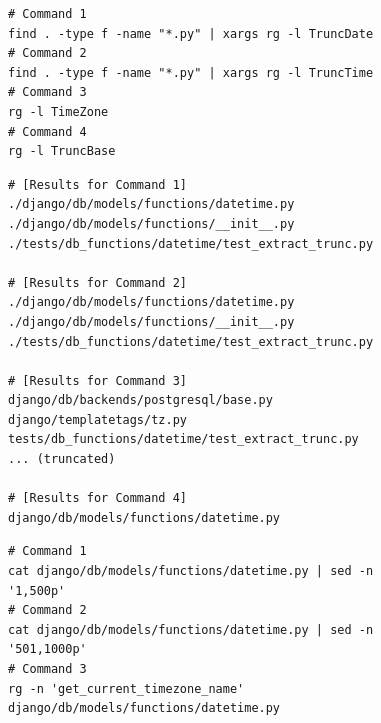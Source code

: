 \begin{figure}[!ht]
    \centering

\begin{tcolorbox}[colback=blue!3!white, colframe=blue!75!black, title={\small Action 1 (Terminal Tool - 4 parallel calls)}]
\begin{lstlisting}[basicstyle=\fontsize{7.5}{8.5}\ttfamily, breaklines=true]
# Command 1
find . -type f -name "*.py" | xargs rg -l TruncDate
# Command 2
find . -type f -name "*.py" | xargs rg -l TruncTime
# Command 3
rg -l TimeZone
# Command 4
rg -l TruncBase
\end{lstlisting}
\end{tcolorbox}

\begin{tcolorbox}[colback=orange!5!white, colframe=orange!75!black, title={\small Observation 1 (trimmed)}]
\begin{lstlisting}[basicstyle=\fontsize{7.5}{8.5}\ttfamily, breaklines=true]
# [Results for Command 1]
./django/db/models/functions/datetime.py
./django/db/models/functions/__init__.py
./tests/db_functions/datetime/test_extract_trunc.py

# [Results for Command 2]
./django/db/models/functions/datetime.py
./django/db/models/functions/__init__.py
./tests/db_functions/datetime/test_extract_trunc.py

# [Results for Command 3]
django/db/backends/postgresql/base.py
django/templatetags/tz.py
tests/db_functions/datetime/test_extract_trunc.py
... (truncated)

# [Results for Command 4]
django/db/models/functions/datetime.py
\end{lstlisting}
\end{tcolorbox}
\begin{tcolorbox}[colback=blue!3!white, colframe=blue!75!black, title={\small Action 2 (Terminal Tool - 3 parallel calls)}]
\begin{lstlisting}[basicstyle=\fontsize{7.5}{8.5}\ttfamily, breaklines=true]
# Command 1
cat django/db/models/functions/datetime.py | sed -n '1,500p'
# Command 2
cat django/db/models/functions/datetime.py | sed -n '501,1000p'
# Command 3
rg -n 'get_current_timezone_name' django/db/models/functions/datetime.py
\end{lstlisting}
\end{tcolorbox}


\end{figure}

